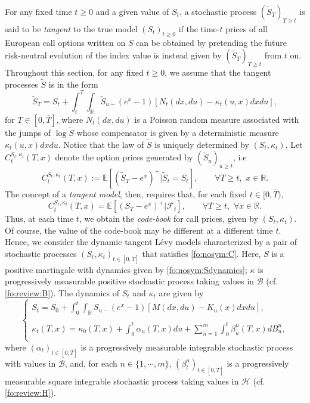 \documentclass{article}
\numberwithin{equation}{section}
\newcommand\EE {\mathbb E}
\newcommand\RR {\mathbb R}
\begin{document}
For any fixed time $t\ge 0$ and a given value of $S_t$, a stochastic process $(\tilde{S}_{T})_{T\ge t}$ is said to be \emph{tangent} to the true model $(S_t)_{t\geq 0}$ if the time-$t$ prices of all European call options written on $S$ can be obtained by pretending the future risk-neutral evolution of the index value is instead given by $(\tilde{S}_T)_{T\ge t}$ from $t$ on. Throughout this section, for any fixed $t\geq0$, we assume that the tangent processes $\tilde{S}$ is in the form
\begin{equation}
\label{fo:nosym:jumpunderlying}
\tilde{S}_T = S_t + \int_t^T \int_{\RR} \tilde{S}_{u-}(e^x-1)\left[N_t(dx,du)-\kappa_t(u,x)dx du\right],
\end{equation}
for $T\in[0,\bar{T}]$, where $N_t(dx,du)$ is a Poisson random measure associated with the jumps of $\log \tilde{S}$ whose compensator is given by a deterministic measure $\kappa_t(u,x)dxdu$.
Notice that the law of $\tilde{S}$ is uniquely determined by $(S_t,\kappa_t)$. Let $C_t^{S_t,\kappa_t}(T,x)$ denote the option prices generated by $(\tilde{S}_u)_{u \geq t}$, i.e
\begin{equation}\label{fo:nosym:Cdef}
C_t^{S_t,\kappa_t}(T,x) := \EE \left[(\tilde{S}_T - e^x)^+ | \tilde{S}_t = S_t \right],\qquad \forall T\geq t,\,\, x\in\RR.
\end{equation}
The concept of a \emph{tangent model}, then, requires that, for each fixed $t \in [0, \bar{T})$,
\begin{equation}
C_t^{S_t,\kappa_t}(T,x) = \EE \left[(S_T-e^x)^+ |\mathcal {F}_t \right], \qquad \forall T\geq t,\,\,\forall x\in\RR. \label{fo:nosym:C}
\end{equation}
Thus, at each time $t$, we obtain the \emph{code-book} for call prices, given by $(S_t, \kappa_t)$.
Of course, the value of the code-book may be different at a different time $t$. Hence, we consider the dynamic tangent L\'{e}vy models characterized by a pair of stochastic processes $(S_t, \kappa_t)_{t\in[0,\bar{T}]}$ that satisfies \eqref{fo:nosym:C}. Here, $S$ is a positive martingale with dynamics given by \eqref{fo:nosym:Sdynamics}; $\kappa$ is progressively measurable positive stochastic process taking values in $\mathcal{B}$ (cf. \eqref{fo:review:B}). The dynamics of $S_t$ and $\kappa_t$ are given by
\begin{equation}\label{fo:nosym:dyn}
\left\{
\begin{array}{c}
{ S_t = S_0 + \int_0^t \int_{\RR}S_{u-}(e^x-1)[M(dx,du)-K_u(x)dxdu],}\\
{}\\
{ \kappa_t(T,x) = \kappa_0(T,x) + \int_0^{t}\alpha_u(T,x) du + \sum_{n=1}^m \int_0^{t} \beta^{n}_u(T,x) dB^n_u,}\\
\end{array}
\right.
\end{equation}
where
$(\alpha_t)_{t\in[0,\bar{T}]}$ is a progressively measurable integrable stochastic process with values in $\mathcal{B}$, and, for each $n\in\{1,\cdots,m\}$, $(\beta^n_t)_{t\in [0,\bar{T}]}$ is a progressively measurable square integrable stochastic process taking values in $\mathcal{H}$ (cf. \eqref{fo:review:H}). 
\end{document}
